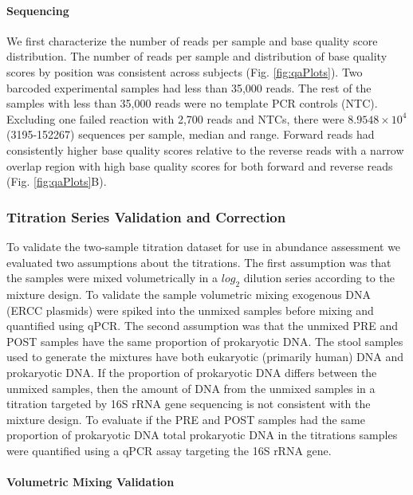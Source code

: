 \documentclass[linenumbers]{bmcart}
\begin{document}
\paragraph{Sequencing}
We first characterize the number of reads per sample and base quality
score distribution. The number of reads per sample and distribution of
base quality scores by position was consistent across subjects (Fig.
\ref{fig:qaPlots}). Two barcoded experimental samples had less than
35,000 reads. The rest of the samples with less than 35,000 reads were
no template PCR controls (NTC). Excluding one failed reaction with 2,700
reads and NTCs, there were \(8.9548\times 10^{4}\) (3195-152267)
sequences per sample, median and range. Forward reads had consistently
higher base quality scores relative to the reverse reads with a narrow
overlap region with high base quality scores for both forward and
reverse reads (Fig. \ref{fig:qaPlots}B).

\subsubsection*{Titration Series Validation and Correction}

To validate the two-sample titration dataset for use in abundance
assessment we evaluated two assumptions about the titrations. The first assumption was that the
samples were mixed volumetrically in a \(log_2\) dilution series
according to the mixture design. To validate the sample volumetric mixing exogenous
DNA (ERCC plasmids) were spiked into the unmixed samples before mixing and quantified
using qPCR. The second assumption was that the unmixed PRE and POST samples
have the same proportion of prokaryotic DNA. The stool samples used to
generate the mixtures have both eukaryotic (primarily human) DNA and
prokaryotic DNA. If the proportion of prokaryotic DNA differs between
the unmixed samples, then the amount of DNA from the unmixed samples in
a titration targeted by 16S rRNA gene sequencing is not consistent with
the mixture design. To evaluate if the PRE and POST samples had the same
proportion of prokaryotic DNA total prokaryotic DNA in the titrations
samples were quantified using a qPCR assay targeting the 16S rRNA gene.


\paragraph*{Volumetric Mixing Validation}
\end{document}
